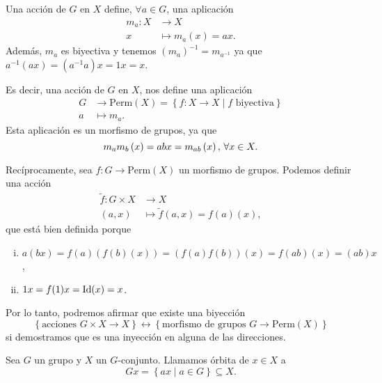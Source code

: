 \begin{obs}
    Una acción de $G$ en $X$ define, $\forall a \in G$, una aplicación
    \[
        \begin{aligned}
            m_a \colon X &\to X \\
            x &\mapsto m_a(x) = ax.
        \end{aligned}
    \]
    Además, $m_a$ es biyectiva y tenemos $\left( m_a \right)^{-1} = m_{a^{-1}}$ ya que $a^{-1}(ax) = \left( a^{-1}a \right)x = 1x = x$.
    
    Es decir, una acción de $G$ en $X$, nos define una aplicación
    \[
        \begin{aligned}
            G &\to \text{Perm}(X) = \left\{ f \colon X \to X \mid f \text{ biyectiva} \right\} \\
            a &\mapsto m_a.
        \end{aligned}
    \]
    Esta aplicación es un morfismo de grupos, ya que
    \[
        m_am_b\left( x\right)=abx=m_{ab}\left( x\right),\,\forall x\in X.
    \]
    
    Recíprocamente, sea $f \colon G \to \text{Perm}(X)$ un morfismo de grupos. Podemos
    definir una acción
    \[
        \begin{aligned}
            \tilde{f} \colon G \times X &\to X \\
            (a, x) &\mapsto \tilde{f}(a, x) = f(a)(x),
        \end{aligned}
    \]
    que está bien definida porque
    \begin{enumerate}[i)]
        \item $a(bx) = f(a)\left( f(b)(x) \right) = \left( f(a)f(b) \right)(x) = f(ab)(x) = (ab)x$,
        \item $1x = f(1)x = \operatorname{Id}(x) = x$.
    \end{enumerate}

    Por lo tanto, podremos afirmar que existe una biyección
    \[
        \left\{ \text{acciones } G \times X \to X \right\} \leftrightarrow
        \left\{ \text{morfismo de grupos } G \to \text{Perm}(X) \right\}
    \]
    si demostramos que es una inyección en alguna de las direcciones.
\end{obs}

\begin{defi}
    Sea $G$ un grupo y $X$ un $G$-conjunto. Llamamos órbita de $x \in X$ a
    \[
        Gx = \left\{ ax \mid a \in G \right\} \subseteq X.
    \]
\end{defi}

